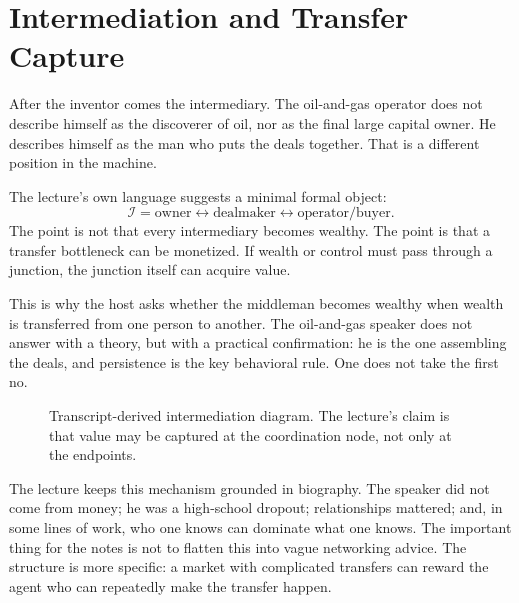 \section{Intermediation and Transfer Capture}

After the inventor comes the intermediary. The oil-and-gas operator does not describe himself as the discoverer of oil, nor as the final large capital owner. He describes himself as the man who puts the deals together. That is a different position in the machine.

The lecture's own language suggests a minimal formal object:
\begin{equation}
\mathcal I
=
\text{owner}
\longleftrightarrow
\text{dealmaker}
\longleftrightarrow
\text{operator/buyer}.
\end{equation}
The point is not that every intermediary becomes wealthy. The point is that a transfer bottleneck can be monetized. If wealth or control must pass through a junction, the junction itself can acquire value.

This is why the host asks whether the middleman becomes wealthy when wealth is transferred from one person to another. The oil-and-gas speaker does not answer with a theory, but with a practical confirmation: he is the one assembling the deals, and persistence is the key behavioral rule. One does not take the first no.

\begin{figure}
\centering
{}
\caption{Transcript-derived intermediation diagram. The lecture's claim is that value may be captured at the coordination node, not only at the endpoints.}
\end{figure}

The lecture keeps this mechanism grounded in biography. The speaker did not come from money; he was a high-school dropout; relationships mattered; and, in some lines of work, who one knows can dominate what one knows. The important thing for the notes is not to flatten this into vague networking advice. The structure is more specific: a market with complicated transfers can reward the agent who can repeatedly make the transfer happen.

